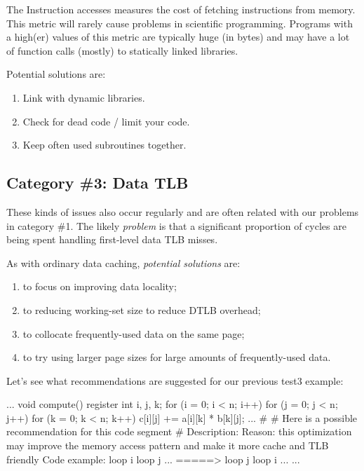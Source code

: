 The Instruction accesses measures the cost of fetching instructions from memory. This metric will rarely cause problems in scientific programming. Programs with a high(er) values of this metric are typically huge (in bytes) and may have a lot of function calls (mostly) to statically linked libraries.

Potential solutions are:

\begin{enumerate}
  \item  Link with dynamic libraries.
  \item  Check for dead code / limit your code.
  \item  Keep often used subroutines together.
\end{enumerate}

\subsection{Category \#3: Data TLB}
\label{subsec:CAT3_Data_TLB}

These kinds of issues also occur regularly and are often related with our problems in category \#1. The likely \emph{problem} is that a significant proportion of cycles are being spent handling first-level data TLB misses.

As with ordinary data caching, \emph{potential solutions} are:

\begin{enumerate}
  \item  to focus on improving data locality;
  \item  to reducing working-set size to reduce DTLB overhead;
  \item  to collocate frequently-used data on the same page;
  \item  to try using larger page sizes for large amounts of frequently-used data.
\end{enumerate}

Let's see what recommendations are suggested for our previous test3 example:

\begin{prompt}
...
void compute()
{
register int i, j, k;
for (i = 0; i < n; i++)
  for (j = 0; j < n; j++)
    for (k = 0; k < n; k++)
      c[i][j] += a[i][k] * b[k][j];
}
...
\#
\# Here is a possible recommendation for this code segment
\#
Description: %
Reason: this optimization may improve the memory access pattern and make it more cache and TLB friendly
Code example:
loop i {
  loop j {...}
}
=====>
loop j {
  loop i {...}
}
...
\end{prompt}

